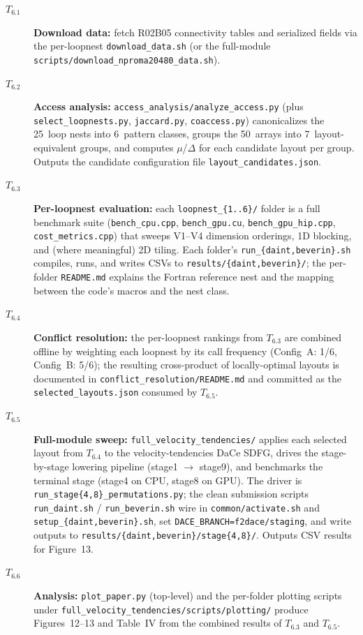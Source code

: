 \documentclass[conference]{IEEEtran}
\begin{document}
\begin{description}
\item[$T_{6.1}$] \textbf{Download data:} fetch R02B05 connectivity tables and serialized fields via the per-loopnest \texttt{download\_data.sh} (or the full-module \texttt{scripts/download\_nproma20480\_data.sh}).

\item[$T_{6.2}$] \textbf{Access analysis:} \texttt{access\_analysis/analyze\_access.py} (plus \texttt{select\_loopnests.py}, \texttt{jaccard.py}, \texttt{coaccess.py}) canonicalizes the 25~loop nests into 6~pattern classes, groups the 50~arrays into 7~layout-equivalent groups, and computes $\mu$/$\Delta$ for each candidate layout per group.
Outputs the candidate configuration file \texttt{layout\_candidates.json}.

\item[$T_{6.3}$] \textbf{Per-loopnest evaluation:} each \texttt{loopnest\_\{1..6\}/} folder is a full bench\-mark suite (\texttt{bench\_cpu.cpp}, \texttt{bench\_gpu.cu}, \texttt{bench\_gpu\_hip.cpp}, \texttt{cost\_metrics.cpp}) that sweeps V1--V4 dimension orderings, 1D blocking, and (where meaningful) 2D tiling.
Each folder's \texttt{run\_\{daint,beverin\}.sh} compiles, runs, and writes CSVs to \texttt{results/\{daint,beverin\}/}; the per-folder \texttt{README.md} explains the Fortran reference nest and the mapping between the code's macros and the nest class.

\item[$T_{6.4}$] \textbf{Conflict resolution:} the per-loopnest rankings from $T_{6.3}$ are combined offline by weighting each loopnest by its call frequency (Config~A: 1/6, Config~B: 5/6); the resulting cross-product of locally-optimal layouts is documented in \texttt{conflict\_resolution/README.md} and committed as the \texttt{selected\_layouts.json} consumed by $T_{6.5}$.

\item[$T_{6.5}$] \textbf{Full-module sweep:} \texttt{full\_velocity\_tendencies/} applies each selected layout from $T_{6.4}$ to the velocity-tendencies DaCe SDFG, drives the stage-by-stage lowering pipeline (stage1 $\to$ stage9), and benchmarks the terminal stage (stage4 on CPU, stage8 on GPU).
The driver is \texttt{run\_stage\{4,8\}\_permutations.py}; the clean submission scripts \texttt{run\_daint.sh} / \texttt{run\_beverin.sh} wire in \texttt{common/activate.sh} and \texttt{setup\_\{daint,beverin\}.sh}, set \texttt{DACE\_BRANCH=f2dace/staging}, and write outputs to \texttt{results/\{daint,beverin\}/stage\{4,8\}/}.
Outputs CSV results for Figure~13.

\item[$T_{6.6}$] \textbf{Analysis:} \texttt{plot\_paper.py} (top-level) and the per-folder plotting scripts under \texttt{full\_velocity\_tendencies/scripts/plotting/} produce Figures~12--13 and Table~IV from the combined results of $T_{6.3}$ and $T_{6.5}$.
\end{description}
\end{document}
